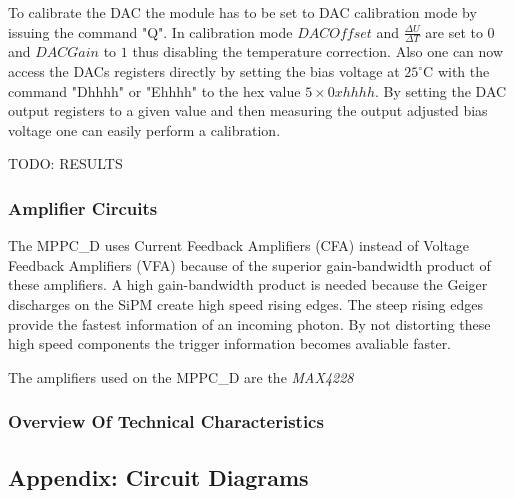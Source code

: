 \documentclass[]{article}
\begin{document}
To calibrate the DAC the module has to be set to DAC calibration mode by issuing the command "Q". In calibration mode $DACOffset$ and $\frac{\Delta U}{\Delta T}$ 
are set to $0$ and $DACGain$ to $1$ thus disabling the temperature correction. Also one can now access the DACs registers directly by setting the bias voltage 
at $25^{\circ} \text{C}$ with the command "Dhhhh" or "Ehhhh" to the hex value $5\times0xhhhh$. By setting the DAC output registers to a given value and then measuring the 
output adjusted bias voltage one can easily perform a calibration.

TODO: RESULTS	

\newpage

\subsubsection{Amplifier Circuits}

The MPPC\_D uses Current Feedback Amplifiers (CFA) instead of Voltage Feedback Amplifiers (VFA) because of the superior gain-bandwidth product of these amplifiers. A high 
gain-bandwidth product is needed because the Geiger discharges on the SiPM create high speed rising edges. The steep rising edges provide the fastest information of an incoming photon. 
By not distorting these high speed components the trigger information becomes avaliable faster.

The amplifiers used on the MPPC\_D are the \emph{MAX4228} 

\subsubsection{Overview Of Technical Characteristics}

\subsection{Appendix: Circuit Diagrams}
\end{document}
